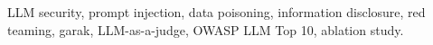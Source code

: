 \documentclass[journal,onecolumn,10pt]{IEEEtran}
\begin{document}
\begin{IEEEkeywords}
LLM security, prompt injection, data poisoning, information disclosure,
red teaming, garak, LLM-as-a-judge, OWASP LLM Top 10, ablation study.
\end{IEEEkeywords}










{\scriptsize

}
\end{document}
